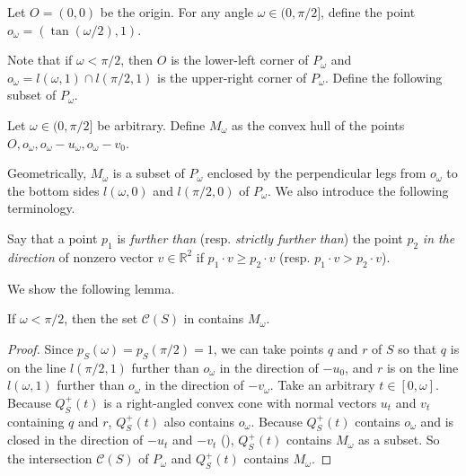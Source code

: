 \begin{definition}

Let \(O = (0, 0)\) be the origin. For any angle \(\omega \in (0, \pi/2]\), define the point \(o_\omega = (\tan(\omega/2), 1)\).

\label{def:parallelogram-vertices}
\end{definition}

Note that if \(\omega < \pi/2\), then \(O\) is the lower-left corner of \(P_\omega\) and \(o_{\omega} = l(\omega, 1) \cap l(\pi/2, 1)\) is the upper-right corner of \(P_\omega\). Define the following subset of \(P_\omega\).

\begin{definition}

Let \(\omega \in (0, \pi/2]\) be arbitrary. Define \(M_\omega\) as the convex hull of the points \(O, o_\omega, o_\omega-u_\omega, o_\omega-v_0\).

\label{def:middle-set}
\end{definition}

Geometrically, \(M_\omega\) is a subset of \(P_\omega\) enclosed by the perpendicular legs from \(o_\omega\) to the bottom sides \(l(\omega, 0)\) and \(l(\pi/2, 0)\) of \(P_\omega\). We also introduce the following terminology.

\begin{definition}

Say that a point \(p_1\) is \emph{further than} (resp. \emph{strictly further than}) the point \(p_2\) \emph{in the direction} of nonzero vector \(v \in \mathbb{R}^2\) if \(p_1 \cdot v \geq p_2 \cdot v\) (resp. \(p_1 \cdot v > p_2 \cdot v\)).

\label{def:further-in-direction}
\end{definition}

We show the following lemma.

\begin{lemma}

If \(\omega < \pi/2\), then the set \(\mathcal{C}(S)\) in  contains \(M_\omega\).

\label{lem:cap-contains-middle-set}
\end{lemma}

\begin{proof}
Since \(p_S(\omega) = p_S(\pi/2) = 1\), we can take points \(q\) and \(r\) of \(S\) so that \(q\) is on the line \(l(\pi/2, 1)\) further than \(o_\omega\) in the direction of \(-u_0\), and \(r\) is on the line \(l(\omega, 1)\) further than \(o_\omega\) in the direction of \(-v_\omega\). Take an arbitrary \(t \in [0, \omega]\). Because \(Q^+_S(t)\) is a right-angled convex cone with normal vectors \(u_t\) and \(v_t\) containing \(q\) and \(r\), \(Q_S^+(t)\) also contains \(o_\omega\). Because \(Q_S^+(t)\) contains \(o_\omega\) and is closed in the direction of \(-u_t\) and \(-v_t\) (), \(Q_S^+(t)\) contains \(M_\omega\) as a subset. So the intersection \(\mathcal{C}(S)\) of \(P_\omega\) and \(Q_S^+(t)\) contains \(M_\omega\).
\end{proof}

